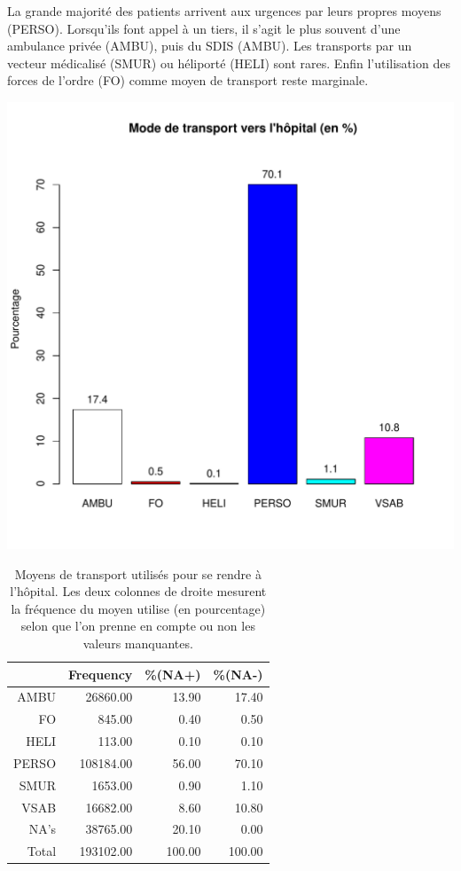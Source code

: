 \documentclass[12pt,english,french,twoside]{report}\usepackage[]{graphicx}\usepackage[]{color}
\makeatletter
\def\maxwidth{ %
  \ifdim\Gin@nat@width>\linewidth
    \linewidth
  \else
    \Gin@nat@width
  \fi
}
\makeatother
\begin{document}
La grande majorité des patients arrivent aux urgences par leurs propres moyens (PERSO). Lorsqu'ils font appel à un tiers, il s'agit le plus souvent d'une ambulance privée (AMBU), puis du SDIS (AMBU). Les transports par un vecteur médicalisé (SMUR) ou héliporté (HELI) sont rares. Enfin l'utilisation des forces de l'ordre (FO) comme moyen de transport reste marginale.


\includegraphics[width=\maxwidth]{figure/transport} 
\begin{table}[ht]
\centering
\begin{tabular}{rrrr}
  \hline
 & Frequency &   \%(NA+) &   \%(NA-) \\ 
  \hline
AMBU & 26860.00 & 13.90 & 17.40 \\ 
  FO & 845.00 & 0.40 & 0.50 \\ 
  HELI & 113.00 & 0.10 & 0.10 \\ 
  PERSO & 108184.00 & 56.00 & 70.10 \\ 
  SMUR & 1653.00 & 0.90 & 1.10 \\ 
  VSAB & 16682.00 & 8.60 & 10.80 \\ 
  NA's & 38765.00 & 20.10 & 0.00 \\ 
    Total & 193102.00 & 100.00 & 100.00 \\ 
   \hline
\end{tabular}
\caption[Moyens de transport]{Moyens de transport utilisés pour se rendre à l'hôpital. Les deux colonnes de droite mesurent la fréquence du moyen utilise (en pourcentage) selon que l'on prenne en compte ou non les valeurs manquantes. } 
\label{transport}
\end{table}
\end{document}
